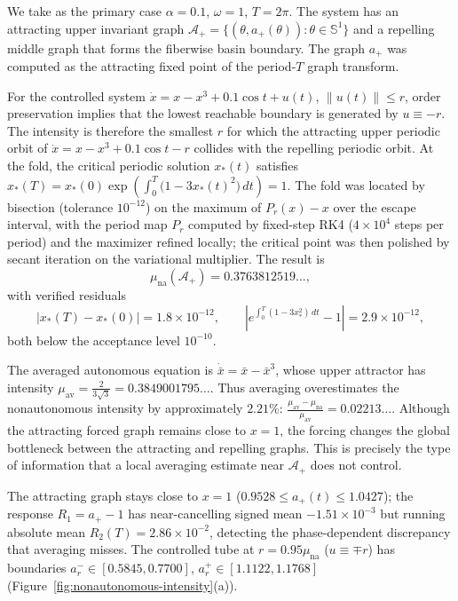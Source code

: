 \documentclass[pdflatex,sn-mathphys-num]{sn-jnl}
\numberwithin{equation}{section}
\theoremstyle{thmstyleone}%
\theoremstyle{definition}
\theoremstyle{remark}
\begin{document}
We take as the primary case
    $\alpha=0.1$,
    $\omega=1$,
    $T=2\pi$.
The system has an attracting upper invariant graph
    $\mathcal A_+
    =
    \{(\theta,a_+(\theta)):\theta\in\mathbb S^1\}$
and a repelling middle graph that forms the fiberwise basin boundary. The graph \(a_+\) was computed as the attracting fixed point of the period-\(T\) graph transform.

For the controlled system
    $\dot x
    =
    x-x^3+0.1\cos t+u(t)$,
    $\|u(t)\|\leq r$,
order preservation implies that the lowest reachable boundary is generated by \(u\equiv-r\).  The intensity is therefore the smallest \(r\) for which the attracting upper periodic orbit of $\dot x=x-x^3+0.1\cos t-r$
collides with the repelling periodic orbit.  At the fold, the critical periodic solution \(x_\ast(t)\) satisfies $x_\ast(T)=x_\ast(0)\exp\left(
        \int_0^T
        \bigl(1-3x_\ast(t)^2\bigr)\,dt
    \right)=1$.
The fold was located by bisection (tolerance $10^{-12}$) on the maximum of $P_r(x)-x$ over the escape interval, with the period map $P_r$ computed by fixed-step RK4 ($4\times10^4$ steps per period) and
the maximizer refined locally; the critical point was then polished by secant iteration on the variational multiplier. The result is
\begin{equation}
    \mu_{\mathrm{na}}(\mathcal A_+)
    =
    0.3763812519\ldots,
    \label{eq:forced-continuous-intensity}
\end{equation}
with verified residuals
\[
    |x_\ast(T)-x_\ast(0)|
    =
    1.8\times10^{-12},
    \qquad
    \left|
        e^{\int_0^T(1-3x_\ast^2)\,dt}-1
    \right|
    =
    2.9\times10^{-12},
\]
both below the acceptance level $10^{-10}$.

The averaged autonomous equation is $\dot{\bar x}=\bar x-\bar x^3$, whose upper attractor has intensity
    $\mu_{\mathrm{av}}
    =
    \frac{2}{3\sqrt3}
    =
    0.3849001795\ldots$.
Thus averaging overestimates the nonautonomous intensity by approximately \(2.21\%\):
    $\frac{
        \mu_{\mathrm{av}}
        -
        \mu_{\mathrm{na}}
    }{
        \mu_{\mathrm{av}}
    }
    =
    0.02213\ldots$.
Although the attracting forced graph remains close to \(x=1\), the forcing changes the global bottleneck between the attracting and repelling graphs. This is precisely the type of information that a local averaging estimate near \(\mathcal A_+\) does not control.

The attracting graph stays close to $x=1$ ($0.9528\le a_+(t)\le1.0427$); the response $R_1=a_+-1$ has near-cancelling signed mean $-1.51\times10^{-3}$ but running absolute mean $R_2(T)=2.86\times10^{-2}$, detecting the phase-dependent discrepancy that averaging misses. The controlled tube at $r=0.95\mu_{\mathrm{na}}$ ($u\equiv\mp r$) has boundaries $a_r^-\in[0.5845,0.7700]$, $a_r^+\in[1.1122,1.1768]$ (Figure~\ref{fig:nonautonomous-intensity}(a)).
\end{document}
